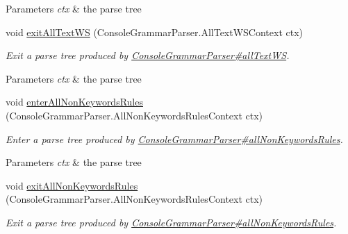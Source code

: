 \begin{DoxyCompactItemize}
\begin{DoxyCompactList}
\begin{DoxyParams}{Parameters}
{\em ctx} & the parse tree\\
\hline
\end{DoxyParams}
 \end{DoxyCompactList}\item 
void \hyperlink{classgov_1_1nasa_1_1jpf_1_1inspector_1_1client_1_1parser_1_1_console_grammar_base_listener_acfc7f4233cd0b066a1514c52e3d552f7}{exit\+All\+Text\+WS} (Console\+Grammar\+Parser.\+All\+Text\+W\+S\+Context ctx)
\begin{DoxyCompactList}\small\item\em Exit a parse tree produced by \hyperlink{classgov_1_1nasa_1_1jpf_1_1inspector_1_1client_1_1parser_1_1_console_grammar_parser_adc161fc81eedd939154fd25e889f5b28}{Console\+Grammar\+Parser\#all\+Text\+WS}.


\begin{DoxyParams}{Parameters}
{\em ctx} & the parse tree\\
\hline
\end{DoxyParams}
 \end{DoxyCompactList}\item 
void \hyperlink{classgov_1_1nasa_1_1jpf_1_1inspector_1_1client_1_1parser_1_1_console_grammar_base_listener_ac696898753661234477b102e4255bad0}{enter\+All\+Non\+Keywords\+Rules} (Console\+Grammar\+Parser.\+All\+Non\+Keywords\+Rules\+Context ctx)
\begin{DoxyCompactList}\small\item\em Enter a parse tree produced by \hyperlink{classgov_1_1nasa_1_1jpf_1_1inspector_1_1client_1_1parser_1_1_console_grammar_parser_a2849ff1ee2341a3450b6fbdbe326336d}{Console\+Grammar\+Parser\#all\+Non\+Keywords\+Rules}.


\begin{DoxyParams}{Parameters}
{\em ctx} & the parse tree\\
\hline
\end{DoxyParams}
 \end{DoxyCompactList}\item 
void \hyperlink{classgov_1_1nasa_1_1jpf_1_1inspector_1_1client_1_1parser_1_1_console_grammar_base_listener_a11a61493a6a9602abd0123869159a7c1}{exit\+All\+Non\+Keywords\+Rules} (Console\+Grammar\+Parser.\+All\+Non\+Keywords\+Rules\+Context ctx)
\begin{DoxyCompactList}\small\item\em Exit a parse tree produced by \hyperlink{classgov_1_1nasa_1_1jpf_1_1inspector_1_1client_1_1parser_1_1_console_grammar_parser_a2849ff1ee2341a3450b6fbdbe326336d}{Console\+Grammar\+Parser\#all\+Non\+Keywords\+Rules}.



\end{DoxyCompactList}
\end{DoxyCompactItemize}
